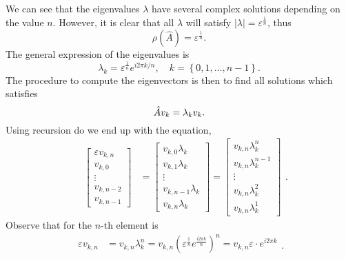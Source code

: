 \documentclass{article}
\theoremstyle{remark}
\begin{document}
    We can see that the eigenvalues $\lambda $ have several complex solutions depending on the value $n$. However, it is clear that all $\lambda $ will satisfy $\left\lvert \lambda  \right\rvert = \varepsilon ^{\frac{1}{n}}$, thus
     \[
    \rho \left( \hat{A} \right) = \varepsilon ^{\frac{1}{n}}.
    \] 
    The general expression of the eigenvalues is \[
     \lambda_k = \varepsilon^{\frac{1}{n}} e^{i2\pi k /n}, \quad    k = \left\{ 0,1,\ldots,n -1 \right\} .
    \] 
    The procedure to compute the eigenvectors is then to find all solutions  which satisfies \[
      \hat{A} v_{k}    = \lambda _{k} v_{k}. \\
    \] 
    Using recursion do we end up with the equation,
        \[
      \begin{split}
         \quad   \begin{bmatrix} 
        \varepsilon v_{k,n} \\
        v_{k,0}\\
        \vdots  \\
        v_{k,n-2} \\
        v_{k,n-1}
      \end{bmatrix} 
       & = \begin{bmatrix} 
       v_{k,0} \lambda _{k} \\
       v_{k,1} \lambda _{k} \\
       \vdots  \\
       v_{k,n-1} \lambda _{k} \\
       v_{k,n} \lambda _{k}
       \end{bmatrix} 
       = \begin{bmatrix} 
         v_{k,n} \lambda _{k}^{n}\\
         v_{k,n} \lambda _{k}^{n-1}\\
         \vdots \\
         v_{k,n } \lambda _{k} ^{2} \\
         v_{k,n } \lambda _{k} ^{1}
       \end{bmatrix} 
      \end{split} .
    \] 
    Observe that for the $n$-th element is \[
      \begin{split}
      \varepsilon v_{k,n}   & = v_{k,n}\lambda _{k} ^{n} = v_{k,n} \left( \varepsilon ^{\frac{1}{n}} e^{\frac{i 2\pi k}{ n} } \right)^{n} = v_{k,n} \varepsilon \cdot  e^{i2\pi  k }  \\
      \end{split}. 
    \] 
\end{document}

